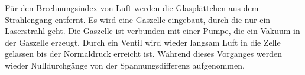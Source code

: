 Für den Brechnungsindex von Luft werden die Glasplättchen
aus dem Strahlengang entfernt. Es wird eine Gaszelle eingebaut, durch
die nur ein Laserstrahl geht. Die Gaszelle ist verbunden mit einer Pumpe,
die ein Vakuum in der Gaszelle erzeugt. Durch ein Ventil wird wieder langsam
Luft in die Zelle gelassen bis der Normaldruck erreicht ist. Während
dieses Vorganges werden wieder Nulldurchgänge von der Spannungsdifferenz aufgenommen.
